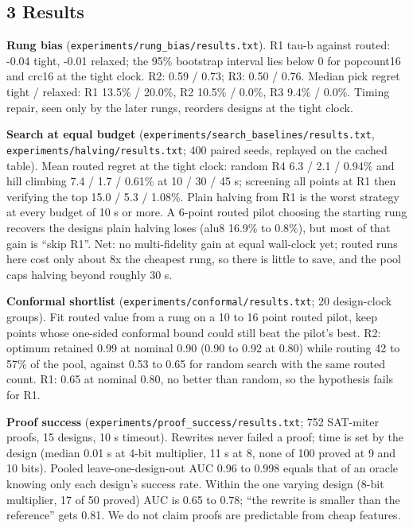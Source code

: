 \documentclass[conference]{IEEEtran}
\begin{document}
\hypertarget{results}{%
\subsection{3 Results}\label{results}}

\textbf{Rung bias} (\texttt{experiments/\allowbreak{}rung\_\allowbreak{}bias/\allowbreak{}results.txt}). R1
tau-b against routed: -0.04 tight, -0.01 relaxed; the 95\% bootstrap
interval lies below 0 for popcount16 and crc16 at the tight clock. R2:
0.59 / 0.73; R3: 0.50 / 0.76. Median pick regret tight / relaxed: R1
13.5\% / 20.0\%, R2 10.5\% / 0.0\%, R3 9.4\% / 0.0\%. Timing repair,
seen only by the later rungs, reorders designs at the tight clock.

\textbf{Search at equal budget}
(\texttt{experiments/\allowbreak{}search\_\allowbreak{}baselines/\allowbreak{}results.txt},
\texttt{experiments/\allowbreak{}halving/\allowbreak{}results.txt}; 400 paired seeds, replayed on
the cached table). Mean routed regret at the tight clock: random R4 6.3
/ 2.1 / 0.94\% and hill climbing 7.4 / 1.7 / 0.61\% at 10 / 30 / 45 s;
screening all points at R1 then verifying the top 15.0 / 5.3 / 1.08\%.
Plain halving from R1 is the worst strategy at every budget of 10 s or
more. A 6-point routed pilot choosing the starting rung recovers the
designs plain halving loses (alu8 16.9\% to 0.8\%), but most of that
gain is ``skip R1''. Net: no multi-fidelity gain at equal wall-clock
yet; routed runs here cost only about 8x the cheapest rung, so there is
little to save, and the pool caps halving beyond roughly 30 s.

\textbf{Conformal shortlist}
(\texttt{experiments/\allowbreak{}conformal/\allowbreak{}results.txt}; 20 design-clock groups).
Fit routed value from a rung on a 10 to 16 point routed pilot, keep
points whose one-sided conformal bound could still beat the pilot's
best. R2: optimum retained 0.99 at nominal 0.90 (0.90 to 0.92 at 0.80)
while routing 42 to 57\% of the pool, against 0.53 to 0.65 for random
search with the same routed count. R1: 0.65 at nominal 0.80, no better
than random, so the hypothesis fails for R1.

\textbf{Proof success} (\texttt{experiments/\allowbreak{}proof\_\allowbreak{}success/\allowbreak{}results.txt};
752 SAT-miter proofs, 15 designs, 10 s timeout). Rewrites never failed a
proof; time is set by the design (median 0.01 s at 4-bit multiplier, 11
s at 8, none of 100 proved at 9 and 10 bits). Pooled
leave-one-design-out AUC 0.96 to 0.998 equals that of an oracle knowing
only each design's success rate. Within the one varying design (8-bit
multiplier, 17 of 50 proved) AUC is 0.65 to 0.78; ``the rewrite is
smaller than the reference'' gets 0.81. We do not claim proofs are
predictable from cheap features.
\end{document}
